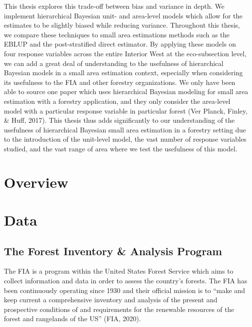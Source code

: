 \documentclass[12pt,twoside]{reedthesis}
\begin{document}
This thesis explores this trade-off between bias and variance in depth. We implement hierarchical Bayesian unit- and area-level models which allow for the estimates to be slightly biased while reducing variance. Throughout this thesis, we compare these techniques to small area estimations methods such as the EBLUP and the post-stratified direct estimator. By applying these models on four response variables across the entire Interior West at the eco-subsection level, we can add a great deal of understanding to the usefulness of hierarchical Bayesian models in a small area estimation context, especially when considering its usefulness to the FIA and other forestry organizations. We only have been able to source one paper which uses hierarchical Bayesian modeling for small area estimation with a forestry application, and they only consider the area-level model with a particular response variable in particular forest (Ver Planck, Finley, \& Huff, 2017). This thesis thus adds significantly to our understanding of the usefulness of hierarchical Bayesian small area estimation in a forestry setting due to the introduction of the unit-level model, the vast number of response variables studied, and the vast range of area where we test the usefulness of this model.

\hypertarget{overview}{%
\chapter{Overview}\label{overview}}

\hypertarget{data}{%
\chapter{Data}\label{data}}

\hypertarget{the-forest-inventory-analysis-program}{%
\section{The Forest Inventory \& Analysis Program}\label{the-forest-inventory-analysis-program}}

The FIA is a program within the United States Forest Service which aims to collect information and data in order to assess the country's forests. The FIA has been continuously operating since 1930 and their official mission is to ``make and keep current a comprehensive inventory and analysis of the present and prospective conditions of and requirements for the renewable resources of the forest and rangelands of the US'' (FIA, 2020).
\end{document}

